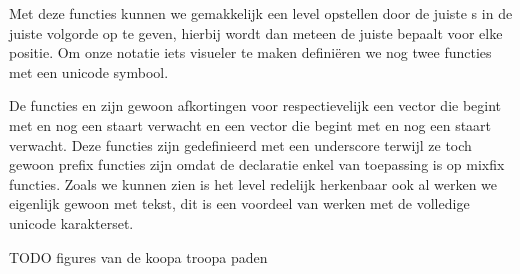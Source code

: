 Met deze functies kunnen we gemakkelijk een level opstellen door de juiste
s in de juiste volgorde op te geven, hierbij wordt dan meteen
de juiste  bepaalt voor elke positie. Om onze notatie iets
visueler te maken definiëren we nog twee functies met een unicode symbool.


De functies  en  zijn gewoon afkortingen voor
respectievelijk een vector die begint met  en nog een staart
verwacht en een vector die begint met  en nog een staart verwacht.
Deze functies zijn gedefinieerd met een underscore terwijl ze toch gewoon prefix
functies zijn omdat de  declaratie enkel van toepassing is op
mixfix functies. Zoals we kunnen zien is het level redelijk herkenbaar ook al
werken we eigenlijk gewoon met tekst, dit is een voordeel van werken met de
volledige unicode karakterset.

TODO figures van de koopa troopa paden
